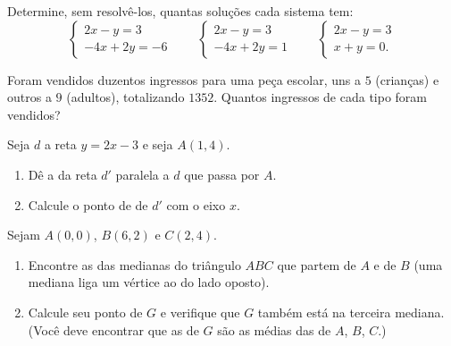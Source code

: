 \begin{exercise}[$\star\star$]\label{exo:g10:lines:7}
Determine, sem resolvê-los, quantas soluções cada sistema tem:
\[
\begin{cases}
2x - y = 3 \\
-4x + 2y = -6
\end{cases}
\qquad
\begin{cases}
2x - y = 3 \\
-4x + 2y = 1
\end{cases}
\qquad
\begin{cases}
2x - y = 3 \\
x + y = 0 .
\end{cases}
\]
\end{exercise}

\begin{exercise}[$\star\star$]\label{exo:g10:lines:8}
Foram vendidos duzentos ingressos para uma peça escolar, uns a $5$
(crianças) e outros a $9$ (adultos), totalizando $1352$. Quantos
ingressos de cada tipo foram vendidos?
\end{exercise}

\begin{exercise}[$\star\star$]\label{exo:g10:lines:9}
Seja $d$ a reta $y = 2x - 3$ e seja $A(1, 4)$.
\begin{enumerate}
  \item Dê a  da reta $d'$ paralela a $d$ que passa por $A$.
  \item Calcule o ponto de  de $d'$ com o eixo $x$.
\end{enumerate}
\end{exercise}

\begin{exercise}[$\star\star\star$]\label{exo:g10:lines:10}
Sejam $A(0, 0)$, $B(6, 2)$ e $C(2, 4)$.
\begin{enumerate}
  \item Encontre as  das medianas do triângulo $ABC$ que partem
        de $A$ e de $B$ (uma mediana liga um vértice ao  do
        lado oposto).
  \item Calcule seu ponto de  $G$ e verifique que $G$ também
        está na terceira mediana. (Você deve encontrar que as 
        de $G$ são as médias das de $A$, $B$, $C$.)
\end{enumerate}
\end{exercise}

